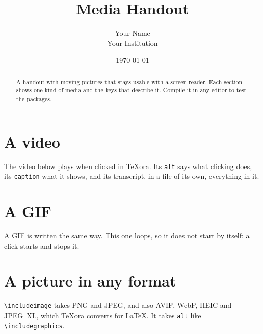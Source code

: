 \documentclass[11pt]{article}
\title{Media Handout}
\author{Your Name\\ Your Institution}
\date{\today}
\begin{document}
\maketitle

\begin{abstract}
  A handout with moving pictures that stays usable with a screen reader. Each section shows one
  kind of media and the keys that describe it. Compile it in any editor to test the packages.
\end{abstract}

\section{A video}
The video below plays when clicked in TeXora. Its \texttt{alt} says what clicking does, its
\texttt{caption} what it shows, and its transcript, in a file of its own, everything in it.

\begin{center}
\end{center}

\section{A GIF}
A GIF is written the same way. This one loops, so it does not start by itself: a click starts
and stops it.

\begin{center}
\end{center}

\section{A picture in any format}
\texttt{\textbackslash includeimage} takes PNG and JPEG, and also AVIF, WebP, HEIC and JPEG~XL,
which TeXora converts for LaTeX. It takes \texttt{alt} like \texttt{\textbackslash includegraphics}.

\begin{center}
\end{center}
\end{document}
